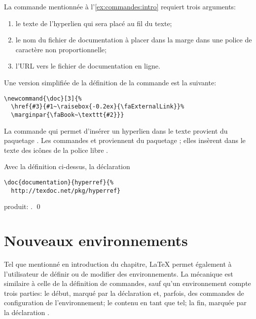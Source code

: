 \begin{exemple}
  \label{ex:commandes:doc}
  La commande \cmdprint{\doc} mentionnée à
  l'\autoref{ex:commandes:intro} requiert trois arguments:
  \begin{enumerate}
  \item le texte de l'hyperlien qui sera placé au fil du texte;
  \item le nom du fichier de documentation à placer dans la marge dans
    une police de caractère non proportionnelle;
  \item l'URL vers le fichier de documentation en ligne.
  \end{enumerate}
  Une version simplifiée de la définition de la commande est la
  suivante:
\begin{lstlisting}
\newcommand{\doc}[3]{%
  \href{#3}{#1~\raisebox{-0.2ex}{\faExternalLink}}%
  \marginpar{\faBook~\texttt{#2}}}
\end{lstlisting}
  La commande \cmd{\href} qui permet d'insérer un hyperlien dans le
  texte provient du paquetage  \citep{hyperref}. Les
  commandes \cmdprint{\faBook} et \cmdprint{\faExternalLink}
  proviennent du paquetage  \citep{fontawesome}; elles
  insèrent dans le texte des icônes de la police libre %
  . %

  Avec la définition ci-dessus, la déclaration
\begin{lstlisting}
\doc{documentation}{hyperref}{%
  http://texdoc.net/pkg/hyperref}
\end{lstlisting}
  produit: . %
  \qed
\end{exemple}


\section{Nouveaux environnements}
\label{sec:commandes:environnements}

Tel que mentionné en introduction du chapitre, {\LaTeX} permet
également à l'utilisateur de définir ou de modifier des
environnements. La mécanique est similaire à celle de la définition de
commandes, sauf qu'un environnement compte trois parties: le début,
marqué par la déclaration  et, parfois, des
  commandes de configuration de l'environnement; le contenu en tant
  que tel; la fin, marquée par la déclaration
  .

